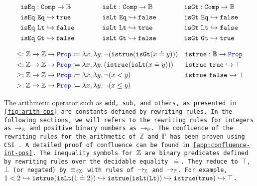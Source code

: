 \[
\begin{array}{l@{\hspace{4em}}l@{\hspace{4em}}l}
\begin{aligned}
  &\tt{isEq} : \tt{Comp} \ra \bb{B} \\
  &\tt{isEq}~\tt{Eq} \re \tt{true} \\
  &\tt{isEq}~\tt{Lt} \re \tt{false} \\
  &\tt{isEq}~\tt{Gt} \re \tt{false} \\
\end{aligned}
&
\begin{aligned}
  &\tt{isLt} : \tt{Comp} \ra \bb{B} \\
  &\tt{isLt}~\tt{Eq} \re \tt{false} \\
  &\tt{isLt}~\tt{Lt} \re \tt{true} \\
  &\tt{isLt}~\tt{Gt} \re \tt{false} \\
\end{aligned}
&
\begin{aligned}
  &\tt{isGt} : \tt{Comp} \ra \bb{B} \\
  &\tt{isGt}~\tt{Eq} \re \tt{false} \\
  &\tt{isGt}~\tt{Lt} \re \tt{false} \\
  &\tt{isGt}~\tt{Gt} \re \tt{true} \\
\end{aligned}
\end{array}
\]

\begin{align*}
&\leq: \bb{Z} \ra \bb{Z} \ra \prop  \coloneq \lambda x,\lambda y, \neg (\tt{istrue}(\tt{isGt}(x \doteq y))) & &\tt{istrue} : \bb{B} \ra \prop \\
&<: \bb{Z} \ra \bb{Z} \ra \prop  \coloneq \lambda x,\lambda y, (\tt{istrue}(\tt{isLt}(x \doteq y))) & &\tt{istrue}~\tt{true} \re \top \\
&\geq: \bb{Z} \ra \bb{Z} \ra \prop  \coloneq \lambda x,\lambda y, \neg (x < y) & &\tt{istrue}~\tt{false} \re \bot \\
&>: \bb{Z} \ra \bb{Z} \ra \prop  \coloneq \lambda x,\lambda y, \neg (x \leq y) & & \\
\end{align*}

The arithmetic operator such as \tt{add}, \tt{sub}, and others, as presented in \cref{fig:arith-ops} are constants defined by rewriting rules. In the following sections, we will refers 
to the rewriting rules for integers as $\ra_\bb{Z}$ and positive binary numbers as $\ra_\bb{P}$.
The confluence of the rewriting rules for the arithmetic of $\mathbb{Z}$ and $\mathbb{P}$ has been proven using CSI \cite{CSI}. A detailed proof of confluence can be found in \cref{app:confluence-int-pos}.
The inequality symbols for $\bb{Z}$ are binary predicates defined by rewriting rules over the decidable equality $\doteq$. They reduce to $\top$, $\bot$ (or negated) by $\equivL$ with rules of $\ra_\bb{Z}$ and $\ra_\bb{P}$.
For example, $1 < 2 \hookrightarrow \tt{istrue}(\tt{isLt}(1 \doteq 2)) \hookrightarrow \tt{istrue}(\tt{isLt}(\tt{Lt})) \hookrightarrow \tt{istrue}(\tt{true}) \hookrightarrow \top$.

